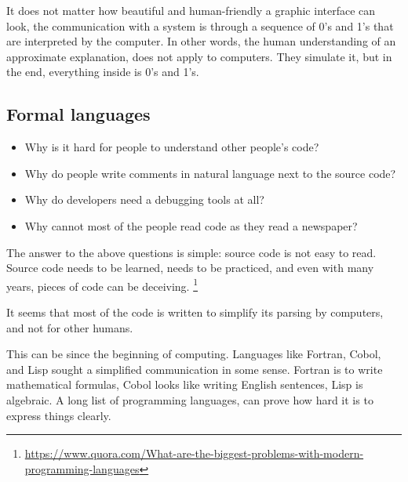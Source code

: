 It does not matter how beautiful and human-friendly a graphic interface can look,
the communication with a system is through a sequence of 0's and 1's that are interpreted by the computer.
In other words, the human understanding of an approximate explanation, does not apply to computers.
They simulate it, but in the end, everything inside is 0's and 1's.


\subsection{Formal languages}

\begin{itemize}
    \item Why is it hard for people to understand other people's code?
    \item Why do people write comments in natural language next to the source code?
    \item Why do developers need a debugging tools at all?
    \item Why cannot most of the people read code as they read a newspaper?
\end{itemize}
The answer to the above questions is simple: source code is not easy to read\cite{Casalnuovo2019}.
Source code needs to be learned, needs to be practiced, and even with many years, pieces of code can be deceiving.
\footnote{\url{https://www.quora.com/What-are-the-biggest-problems-with-modern-programming-languages}}

It seems that most of the code is written to simplify its parsing by computers, and not for other humans.

This can be since the beginning of computing.
Languages like Fortran, Cobol, and Lisp sought a simplified communication in some sense.
Fortran is to write mathematical formulas, Cobol looks like writing English sentences, Lisp is algebraic.
A long list of programming languages, can prove how hard it is to express things clearly.

